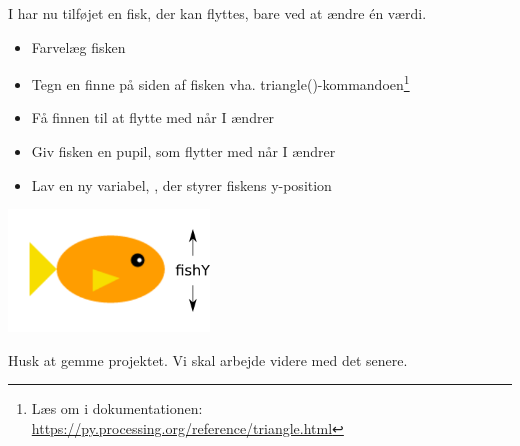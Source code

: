 \documentclass{ucph-handout}
\begin{document}
\begin{exercisebox}[adjusted title=Opgaver]
I har nu tilføjet en fisk, der kan flyttes, bare ved at ændre én
værdi.

\begin{itemize}
\item Farvelæg fisken

\item Tegn en finne på siden af fisken vha. triangle()-kommandoen\footnote{Læs om  i dokumentationen: \url{https://py.processing.org/reference/triangle.html}}

\item Få finnen til at flytte med når I ændrer 

\item Giv fisken en pupil, som flytter med når I ændrer 
  
\item Lav en ny variabel, , der styrer fiskens y-position
\end{itemize}
\hspace{1cm}\includegraphics[width=0.4\textwidth]{../illustrations/images/fisk-fishY.png}

\noindent
Husk at gemme projektet. Vi skal arbejde videre med det senere.
\end{exercisebox}
\newpage
\end{document}
